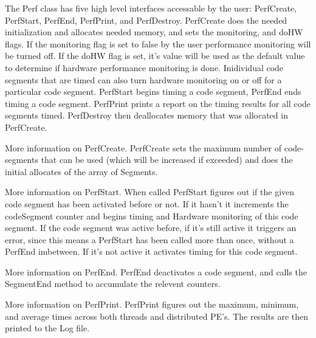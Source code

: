 %


The Perf class has five high level interfaces accessable by the user:
PerfCreate, PerfStart, PerfEnd, PerfPrint, and PerfDestroy. PerfCreate does the needed
initialization and allocates needed memory, and sets the monitoring, and doHW 
flags. If the monitoring flag is set to false by the user performance monitoring 
will be turned off. If the doHW flag is set, it's value will be used as the 
default value to determine if hardware performance monitoring is done. Inidividual code
segments that are timed can also turn hardware monitoring on or off for
a particular code segment. PerfStart begins timing a code segment, PerfEnd
ends timing a code segment. PerfPrint prints a report on the timing results
for all code segments timed. PerfDestroy then deallocates memory that was
allocated in PerfCreate.

More information on PerfCreate. PerfCreate sets the maximum number of code-segments
that can be used (which will be increased if exceeded) and does the initial
allocates of the array of Segments.

More information on PerfStart. When called PerfStart figures out if the given
code segment has been activated before or not. If it hasn't it increments
the codeSegment counter and begins timing and Hardware monitoring of this
code segment. If the code segment was active before, if it's still active
it triggers an error, since this means a PerfStart has been called more than
once, without a PerfEnd imbetween. If it's not active it activates timing
for this code segment.

More information on PerfEnd. PerfEnd deactivates a code segment, and calls
the SegmentEnd method to accumulate the relevent counters.

More information on PerfPrint. PerfPrint figures out the maximum, minimum, and
average times across both threads and distributed PE's. The results are then 
printed to the Log file.
